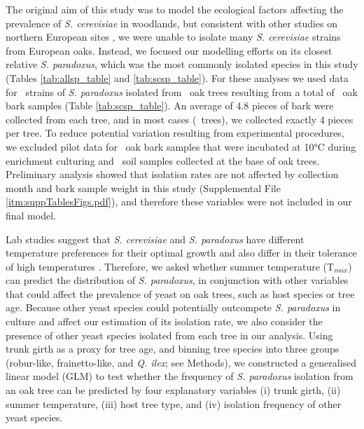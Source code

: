 \documentclass[12pt]{article}
\begin{document}
\begin{linenumbers}
The original aim of this study was to model the ecological factors affecting the prevalence of \textit{S. cerevisiae} in woodlands, but consistent with other studies on northern European sites \citep{johnson_population_2004,kowallik_interaction_2015}, we were unable to isolate many \textit{S. cerevisiae} strains from European oaks. Instead, we focused our modelling efforts on its closest relative \textit{S. paradoxus}, which was the most commonly isolated species in this study (Tables \ref{tab:allsp_table} and \ref{tab:scsp_table}). For these analyses we used data for \sparnotten\ strains of \textit{S. paradoxus} isolated from \treecount\ oak trees resulting from a total of \oakbarknotten\ oak bark samples (Table \ref{tab:scsp_table}). An average of 4.8 pieces of bark were collected from each tree, and in most cases (\treessampledfourtimes\ trees), we collected exactly 4 pieces per tree. To reduce potential variation resulting from experimental procedures, we excluded pilot data for \oakbarkten\ oak bark samples that were incubated at 10\si{\degreeCelsius} during enrichment culturing and \soil\ soil samples collected at the base of oak trees. Preliminary analysis showed that isolation rates are not affected by collection month and bark sample weight in this study (Supplemental File \ref{itm:suppTablesFigs.pdf}), and therefore these variables were not included in our final model. 

Lab studies suggest that \textit{S. cerevisiae} and \textit{S. paradoxus} have different temperature preferences for their optimal growth \citep{sweeney_sympatric_2004,salvado_temperature_2011} and also differ in their tolerance of high temperatures \citep{liti_population_2009}. Therefore, we asked whether summer temperature (T$_{max}$) can predict the distribution of \textit{S. paradoxus}, in conjunction with other variables that could affect the prevalence of yeast on oak trees, such as host species or tree age. Because other yeast species could potentially outcompete \textit{S. paradoxus} in culture and affect our estimation of its isolation rate, we also consider the presence of other yeast species isolated from each tree in our analysis. Using trunk girth as a proxy for tree age, and binning tree species into three groups (robur-like, frainetto-like, and \textit{Q. ilex}; see Methods), we constructed a generalised linear model (GLM) to test whether the frequency of \textit{S. paradoxus} isolation from an oak tree can be predicted by four explanatory variables (i) trunk girth, (ii) summer temperature, (iii) host tree type, and (iv) isolation frequency of other yeast species.


\end{linenumbers}
\end{document}
